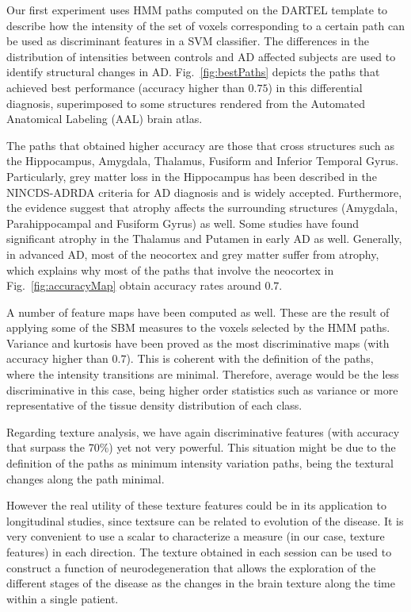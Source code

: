 Our first experiment uses \ac{HMM} paths computed on the DARTEL template to describe how the intensity of the set of voxels corresponding to a certain path can be used as discriminant features in a SVM classifier. The differences in the distribution of intensities between controls and AD affected subjects are used to identify structural changes in AD. Fig.~\ref{fig:bestPaths} depicts the paths that achieved best performance (accuracy higher than $0.75$) in this differential diagnosis, superimposed to some structures rendered from the Automated Anatomical Labeling (AAL) brain atlas\cite{Tzourio-Mazoyer2002}.

The paths that obtained higher accuracy are those that cross structures such as the Hippocampus, Amygdala, Thalamus, Fusiform and Inferior Temporal Gyrus. Particularly, grey matter loss in the Hippocampus has been described in the NINCDS-ADRDA criteria for AD diagnosis\cite{Dubois2007} and is widely accepted\cite{chan2001patterns,Baron2001,Jong2008}. Furthermore, the evidence suggest that atrophy affects the surrounding structures (Amygdala, Parahippocampal and Fusiform Gyrus) as well\cite{chan2001patterns,Baron2001}. Some studies have found significant atrophy in the Thalamus and Putamen in early AD\cite{Jong2008} as well. Generally, in advanced AD, most of the neocortex and grey matter suffer from atrophy\cite{chan2001patterns,Baron2001,Jong2008}, which explains why most of the paths that involve the neocortex in Fig.~\ref{fig:accuracyMap} obtain accuracy rates around $0.7$. 

A number of feature maps have been computed as well. These are the result of applying some of the \ac{SBM} measures to the voxels selected by the \ac{HMM} paths. Variance and kurtosis have been proved as the most discriminative maps (with accuracy higher than $0.7$). This is coherent with the definition of the paths, where the intensity transitions are minimal. Therefore, average would be the less discriminative in this case, being higher order statistics such as variance or more representative of the tissue density distribution of each class. 

Regarding texture analysis, we have again discriminative features (with accuracy that surpass the 70\%) yet not very powerful. This situation might be due to the definition of the paths as minimum intensity variation paths, being the textural changes along the path minimal.  

However the real utility of these texture features could be in its application to longitudinal studies, since textsure can be related to evolution of the disease\cite{sikio2015mr}. It is very convenient to use a scalar to characterize a measure (in our case, texture features) in each direction. The texture obtained in each session can be used to construct a function of neurodegeneration that allows the exploration of the different stages of the disease as the changes in the brain texture along the time within a single patient. 

